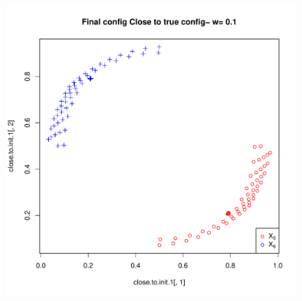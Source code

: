 \documentclass[12pt,oneside,final]{thesis}
\begin{document}
\begin{knitrout}
\color{fgcolor}\begin{kframe}


{\ttfamily\noindent\bfseries{}}\end{kframe}
\end{knitrout}









\begin{figure}
\begin{minipage}[b]{0.5\linewidth}
\centering
\includegraphics[scale=0.45]{true-min-w-0_1.pdf}


\end{minipage}
\end{figure}
\end{document}
